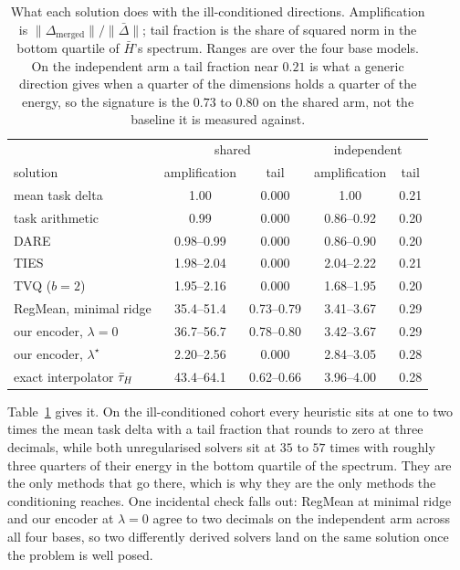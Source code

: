 \begin{table}[t]
\centering
\small
\caption{What each solution does with the ill-conditioned directions.
Amplification is $\|\Delta_{\mathrm{merged}}\|/\|\bar\Delta\|$; tail
fraction is the share of squared norm in the bottom quartile of $\bar H$'s
spectrum. Ranges are over the four base models. On the independent arm a
tail fraction near $0.21$ is what a generic direction gives when a quarter
of the dimensions holds a quarter of the energy, so the signature is the
$0.73$ to $0.80$ on the shared arm, not the baseline it is measured
against.}
\label{tab:mechanism}
\begin{tabular}{lcccc}
\toprule
 & \multicolumn{2}{c}{shared} & \multicolumn{2}{c}{independent} \\
solution & amplification & tail & amplification & tail \\
\midrule
mean task delta            & 1.00 & 0.000 & 1.00 & 0.21 \\
task arithmetic            & 0.99 & 0.000 & 0.86--0.92 & 0.20 \\
DARE                       & 0.98--0.99 & 0.000 & 0.86--0.90 & 0.20 \\
TIES                       & 1.98--2.04 & 0.000 & 2.04--2.22 & 0.21 \\
TVQ ($b{=}2$)              & 1.95--2.16 & 0.000 & 1.68--1.95 & 0.20 \\
\addlinespace
RegMean, minimal ridge     & 35.4--51.4 & 0.73--0.79 & 3.41--3.67 & 0.29 \\
our encoder, $\lambda = 0$ & 36.7--56.7 & 0.78--0.80 & 3.42--3.67 & 0.29 \\
our encoder, $\lambda^\star$ & 2.20--2.56 & 0.000 & 2.84--3.05 & 0.28 \\
\addlinespace
exact interpolator $\bar{\tau}_H$ & 43.4--64.1 & 0.62--0.66 & 3.96--4.00 & 0.28 \\
\bottomrule
\end{tabular}
\end{table}

Table~\ref{tab:mechanism} gives it. On the ill-conditioned cohort every
heuristic sits at one to two times the mean task delta with a tail
fraction that rounds to zero at three decimals, while both unregularised
solvers sit at $35$ to $57$ times with roughly three quarters of their
energy in the bottom quartile of the spectrum. They are the only methods
that go there, which is why they are the only methods the conditioning
reaches. One incidental check falls out: RegMean at minimal ridge and our
encoder at $\lambda = 0$ agree to two decimals on the independent arm
across all four bases, so two differently derived solvers land on the same
solution once the problem is well posed.

